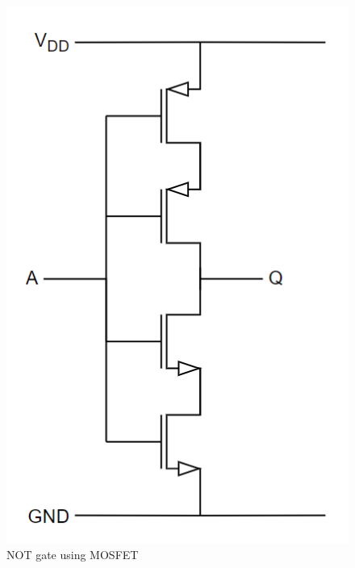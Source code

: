 \begin{figure}[H]
\begin{minipage}{0.5\textwidth}
    \centering
    \includegraphics[width=\linewidth]{Figures/Not gate.png}
    \caption{NOT gate using MOSFET}
    \label{fig:NOT}
\end{minipage}
\begin{minipage}{0.5\textwidth}
    \centering

\end{minipage}
\end{figure}
